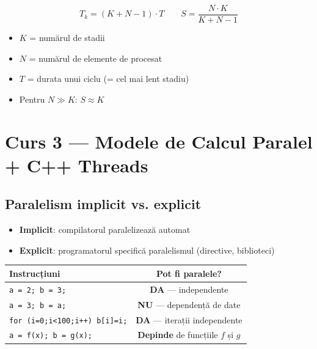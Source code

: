 \documentclass[a4paper,11pt]{article}
\newcommand{\thead}[1]{\cellcolor{tblheader}\color{white}\textbf{#1}}
\begin{document}
\begin{formulabox}
\[
T_k = (K + N - 1) \cdot T \qquad S = \frac{N \cdot K}{K + N - 1}
\]
\begin{itemize}[noitemsep]
  \item $K$ = numărul de stadii
  \item $N$ = numărul de elemente de procesat
  \item $T$ = durata unui ciclu (= cel mai lent stadiu)
  \item Pentru $N \gg K$: $S \approx K$
\end{itemize}
\end{formulabox}

\section{Curs 3 — Modele de Calcul Paralel + C++ Threads}

\subsection{Paralelism implicit vs. explicit}

\begin{itemize}[noitemsep]
  \item \textbf{Implicit}: compilatorul paralelizează automat
  \item \textbf{Explicit}: programatorul specifică paralelismul (directive, biblioteci)
\end{itemize}

\begin{center}
\begin{tabular}{lc}
\toprule
\thead{Instrucțiuni} & \thead{Pot fi paralele?} \\
\midrule
\lstinline|a = 2; b = 3;| & \textcolor{codegreen}{\textbf{DA}} — independente \\
\lstinline|a = 3; b = a;| & \textcolor{accent}{\textbf{NU}} — dependență de date \\
\lstinline|for (i=0;i<100;i++) b[i]=i;| & \textcolor{codegreen}{\textbf{DA}} — iterații independente \\
\lstinline|a = f(x); b = g(x);| & \textcolor{accent}{\textbf{Depinde}} de funcțiile $f$ și $g$ \\
\bottomrule
\end{tabular}
\end{center}
\end{document}
